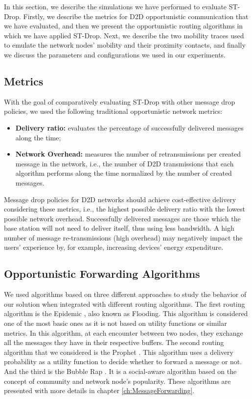 In this section, we describe the simulations we have performed to evaluate ST-Drop. Firstly, we describe the metrics for D2D opportunistic communication that we have evaluated, and then we present the opportunistic routing algorithms in which we have applied ST-Drop. Next, we describe the two mobility traces used to emulate the network nodes' mobility and
their proximity contacts, and finally we discuss the parameters and configurations we used in our experiments.

\subsection{Metrics}

With the goal of comparatively evaluating ST-Drop with other message drop policies, we used the following traditional opportunistic network metrics:

\begin{itemize}
\item \textbf{Delivery ratio:} evaluates the percentage of successfully delivered messages along the time;
\item \textbf{Network Overhead:} measures the number of retransmissions per created message in the network, i.e., the number of D2D transmissions that each algorithm performs along the time normalized by the number of created messages.
\end{itemize}

Message drop policies for D2D networks should achieve cost-effective delivery considering these metrics, i.e., the highest possible delivery ratio with the lowest possible network
overhead. Successfully delivered messages are those which the base station will not need to deliver itself, thus using less bandwidth. A high number of message re-transmissions (high overhead)
may negatively impact the users' experience by, for example, increasing devices' energy expenditure.

\subsection{Opportunistic Forwarding Algorithms}
\label{sec:routingAlgorithms}

We used algorithms based on three different approaches to study the behavior of our solution when integrated with different routing algorithms.
The first routing algorithm is the Epidemic \citep{vahdat2000epidemic}, also known as Flooding. This algorithm is considered one of the most basic ones
as it is not based on utility functions or similar metrics. In this algorithm, at each encounter between two nodes, they exchange all the messages they have in their respective buffers. The second routing algorithm that we considered is the Prophet \citep{lindgren2003probabilistic}. This algorithm uses a delivery probability as a utility function to decide whether to
forward a message or not. And the third is the Bubble Rap \citep{hui2011bubble}. It is a social-aware algorithm based on the concept of community and network node's popularity. These algorithms are presented with more details in chapter \ref{ch:MessageForwarding}.

